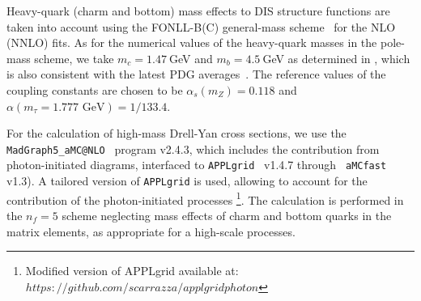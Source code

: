 Heavy-quark (charm and bottom) mass effects to DIS structure functions
are taken into account using the FONLL-B(C) general-mass
scheme~\cite{Forte:2010ta} for the NLO (NNLO) fits.
%
As for the numerical values of the heavy-quark masses in the pole-mass
scheme, we take $m_c=1.47~$GeV and $m_b=4.5~$GeV as determined in \cite{Abramowicz:2015mha}, which is also 
consistent with the latest PDG averages~\cite{Agashe:2014kda}.
%
The reference values of the coupling constants are chosen to be
$\alpha_s(m_Z)=0.118$ and $\alpha(m_\tau=1.777\mbox{ GeV})=1/133.4$.

For the calculation of high-mass Drell-Yan cross sections, we use the
{\tt MadGraph5{\_}aMC@NLO}~\cite{Alwall:2014hca} program v2.4.3, which
includes the contribution from photon-initiated diagrams, interfaced
to {\tt APPLgrid}~\cite{Carli:2010rw} v1.4.7 through {\tt
  aMCfast}~\cite{amcfast} v1.3).
%
A tailored version of {\tt APPLgrid} is used, allowing to account for
the contribution of the photon-initiated processes \footnote{Modified version of APPLgrid available at: $https://github.com/scarrazza/applgridphoton$}.
%
The calculation is performed in the $n_f=5$ scheme neglecting mass
effects of charm and bottom quarks in the matrix elements, as
appropriate for a high-scale processes.

